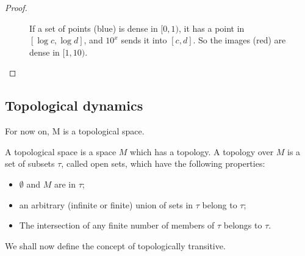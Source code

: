\begin{proof}
\begin{figure}[ht]
    \caption{If a set of points (blue) is dense in $[0,1)$, it has a point in $[\log c,\log d]$,
    and $10^x$ sends it into $[c,d]$. So the images (red) are dense in $[1,10)$.}
    \label{fig:density_exp}
\end{figure}
\end{proof}

\subsection{Topological dynamics}
For now on, M is a topological space.
\begin{definition}
    A topological space is a space $M$ which has a topology. A topology over $M$ is a set of subsets $\tau$, called open sets, which have the following properties: \begin{itemize}
        \item $\emptyset$ and $M$ are in $\tau$;
        \item an arbitrary (infinite or finite) union of sets in $\tau$ belong to $\tau$;
        \item The intersection of any finite number of members of $\tau$ belongs to $\tau$.
    \end{itemize}
\end{definition}

We shall now define the concept of topologically transitive.

